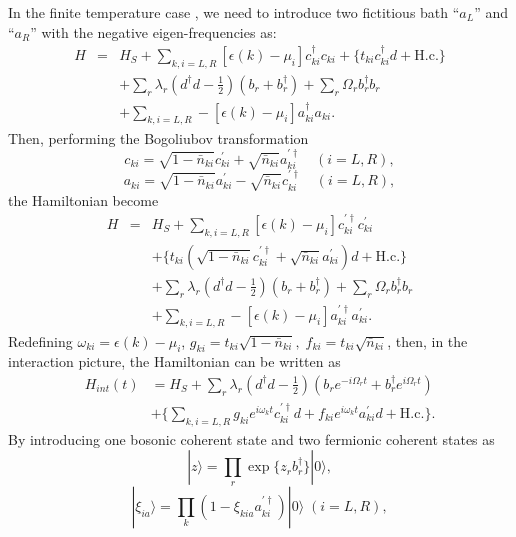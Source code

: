 \documentclass[preprint]{elsarticle}
\begin{document}
In the finite temperature case \cite{Yu-FiniteT}, we need to introduce
two fictitious bath ``$a_{L}$'' and ``$a_{R}$'' with the negative eigen-frequencies
as:
\begin{eqnarray}
H & = & H_{S}+\sum_{k,i=L,R}[\epsilon(k)-\mu_{i}]c_{ki}^{\dagger}c_{ki}+\{t_{ki}c_{ki}^{\dagger}d+ \mathrm{H.c.}\}\nonumber \\
 &  & +\sum_{r}\lambda_{r}(d^{\dagger}d-\frac{1}{2})(b_{r}+b_{r}^{\dagger})+\sum_{r}\Omega_{r}b_{r}^{\dagger}b_{r}\nonumber \\
 &  & +\sum_{k,i=L,R}-[\epsilon(k)-\mu_{i}]a_{ki}^{\dagger}a_{ki}.
\end{eqnarray}
Then, performing the Bogoliubov transformation
\begin{equation}
c_{ki}=\sqrt{1-\bar{n}_{ki}}c_{ki}^{\prime}+\sqrt{\bar{n}_{ki}}a_{ki}^{\prime\dagger}\quad(i=L,R),
\end{equation}
\begin{equation}
a_{ki}=\sqrt{1-\bar{n}_{ki}}a_{ki}^{\prime}-\sqrt{\bar{n}_{ki}}c_{ki}^{\prime\dagger}\quad(i=L,R),
\end{equation}
the Hamiltonian become
\begin{eqnarray}
H & = & H_{S}+\sum_{k,i=L,R}[\epsilon(k)-\mu_{i}]c_{ki}^{\prime\dagger}c_{ki}^{\prime}\nonumber \\
 &  & +\{t_{ki}(\sqrt{1-\bar{n}_{ki}}c_{ki}^{\prime\dagger}+\sqrt{\bar{n}_{ki}}a_{ki}^{\prime})d+ \mathrm{H.c.}\}\nonumber \\
 &  & +\sum_{r}\lambda_{r}(d^{\dagger}d-\frac{1}{2})(b_{r}+b_{r}^{\dagger})+\sum_{r}\Omega_{r}b_{r}^{\dagger}b_{r}\nonumber \\
 &  & +\sum_{k,i=L,R}-[\epsilon(k)-\mu_{i}]a_{ki}^{\prime\dagger}a_{ki}^{\prime}.
\end{eqnarray}
Redefining $\omega_{ki}=\epsilon(k)-\mu_{i}$, $g_{ki}=t_{ki}\sqrt{1-\bar{n}_{ki}},\; f_{ki}=t_{ki}\sqrt{\bar{n}_{ki}}$,
then, in the interaction picture, the Hamiltonian can be written as
\begin{align}
H_{int}(t) & =H_{S}+\sum_{r}\lambda_{r}(d^{\dagger}d-\frac{1}{2})(b_{r}e^{-i\Omega_{r}t}+b_{r}^{\dagger}e^{i\Omega_{r}t})\nonumber \\
 & +\{\sum_{k,i=L,R}g_{ki}e^{i\omega_{k}t}c_{ki}^{\prime\dagger}d+f_{ki}e^{i\omega_{k}t}a_{ki}^{\prime}d+ \mathrm{H.c.}\}.
\end{align}
By introducing one bosonic coherent state and two fermionic coherent
states as
\begin{equation}
|z\rangle=\prod_{r}\exp\{z_{r}b_{r}^{\dagger}\}|0\rangle,
\end{equation}
\begin{equation}
|\xi_{ia}\rangle=\prod_{k}(1-\xi_{kia}a_{ki}^{\prime\dagger})|0\rangle\;(i=L,R),
\end{equation}
\end{document}
